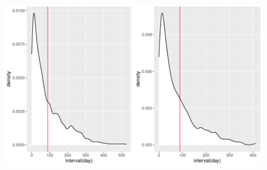 \documentclass[11pt,a4paper,]{article}
\begin{document}
\includegraphics{tidy_files/figure-latex/Q12_2-1.pdf}
\end{document}
